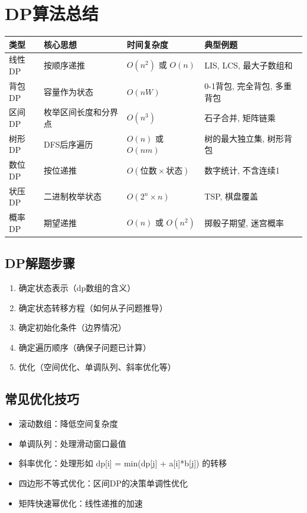 \documentclass[12pt,a4paper]{ctexart}
\begin{document}
	\section{DP算法总结}
	\begin{table}[h]
		\centering
		\begin{tabularx}{\textwidth}{|l|p{4cm}|l|X|}
			\hline
			类型 & 核心思想 & 时间复杂度 & 典型例题 \\
			\hline
			线性DP & 按顺序递推 & \(O(n^2)\) 或 \(O(n)\) & LIS, LCS, 最大子数组和 \\
			\hline
			背包DP & 容量作为状态 & \(O(nW)\) & 0-1背包, 完全背包, 多重背包 \\
			\hline
			区间DP & 枚举区间长度和分界点 & \(O(n^3)\) & 石子合并, 矩阵链乘 \\
			\hline
			树形DP & DFS后序遍历 & \(O(n)\) 或 \(O(nm)\) & 树的最大独立集, 树形背包 \\
			\hline
			数位DP & 按位递推 & \(O(\text{位数} \times \text{状态})\) & 数字统计, 不含连续1 \\
			\hline
			状压DP & 二进制枚举状态 & \(O(2^n \times n)\) & TSP, 棋盘覆盖 \\
			\hline
			概率DP & 期望递推 & \(O(n)\) 或 \(O(n^2)\) & 掷骰子期望, 迷宫概率 \\
			\hline
		\end{tabularx}
	\end{table}
	
	\subsection*{DP解题步骤}
	\begin{enumerate}
		\item 确定状态表示（dp数组的含义）
		\item 确定状态转移方程（如何从子问题推导）
		\item 确定初始化条件（边界情况）
		\item 确定遍历顺序（确保子问题已计算）
		\item 优化（空间优化、单调队列、斜率优化等）
	\end{enumerate}
	
	\subsection*{常见优化技巧}
	\begin{itemize}
		\item 滚动数组：降低空间复杂度
		\item 单调队列：处理滑动窗口最值
		\item 斜率优化：处理形如 dp[i] = min(dp[j] + a[i]*b[j]) 的转移
		\item 四边形不等式优化：区间DP的决策单调性优化
		\item 矩阵快速幂优化：线性递推的加速
	\end{itemize}
	
\end{document}
